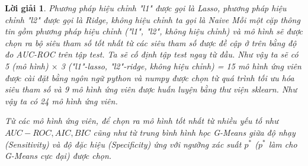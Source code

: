 \documentclass[14pt, a4paper]{article}
\theoremstyle{sltheorem}
\theoremstyle{soltheorem}
\newtheorem*{loigiai}{Lời giải}
\begin{document}
\begin{loigiai}
    Phương pháp hiệu chỉnh "l1" được gọi là Lasso, phương pháp hiệu chỉnh "l2" được gọi là Ridge, không hiệu chỉnh ta gọi là Naive
    Mỗi một cặp thông tin gồm phương pháp hiệu chỉnh ("l1", "l2", không hiệu chỉnh) và mô hình sẽ được chọn ra bộ siêu tham số tốt nhất từ các siêu tham số được đề cập ở trên bằng độ đo AUC-ROC trên tập test.
    Ta sẽ cố định tập test ngay từ đầu.
    Như vậy ta sẽ có 5 (mô hình) $\times$ 3 ("l1"-lasso, "l2"-ridge, không hiệu chỉnh) = 15 mô hình ứng viên được cài đặt bằng ngôn ngữ python và numpy được chọn từ quá trình tối ưu hóa siêu tham số và 9 mô hình ứng viên được huấn luyện bằng thư viện sklearn.
    Như vậy ta có 24 mô hình ứng viên.

    Từ các mô hình ứng viên, để chọn ra mô hình tốt nhất từ nhiều yếu tố như $AUC-ROC, AIC, BIC$ cũng như từ trung bình hình học G-Means giữa độ nhạy (Sensitivity) và độ đặc hiệu (Specificity) ứng với ngưỡng xác suất $p^*$ ($p^*$ làm cho G-Means cực đại) được chọn.


\end{loigiai}
\end{document}
